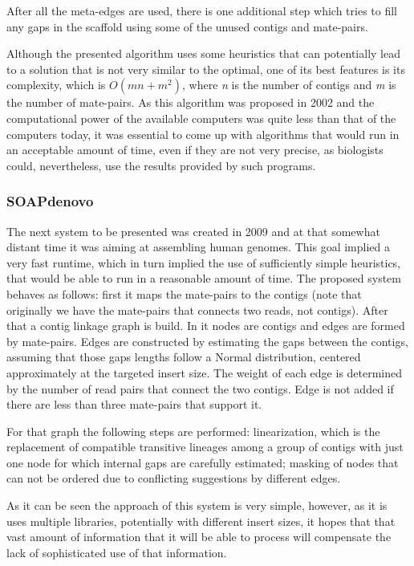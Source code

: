 \documentclass[11pt]{article}
\begin{document}
After all the meta-edges are used, there is one additional step which tries to
fill any gaps in the scaffold using some of the unused contigs and mate-pairs.

Although the presented algorithm uses some heuristics that can potentially lead
to a solution that is not very similar to the optimal, one of its best
features is its complexity, which is $O(m n + m ^ 2)$, where \emph{n} is
the number of contigs and \emph{m} is the number of mate-pairs. As this
algorithm was proposed in 2002 and the computational power of the available
computers was quite less than that of the computers today, it was essential to
come up with algorithms that would run in an acceptable amount of time, even if
they are not very precise, as biologists could, nevertheless, use the results
provided by such programs.

\subsubsection{SOAPdenovo} %
\label{ssub:SOAPdenovo}
The next system to be presented \cite{SOAPdenovo} was created in 2009 and at
that somewhat distant time it was aiming at assembling human genomes. This goal
implied a very fast runtime, which in turn implied the use of sufficiently
simple heuristics, that would be able to run in a reasonable amount of time. The
proposed system behaves as follows: first it maps the mate-pairs to the contigs
(note that originally we have the mate-pairs that connects two reads, not
contigs). After that a contig linkage graph is build. In it nodes are contigs
and edges are formed by mate-pairs. Edges are constructed by estimating the gaps
between the contigs, assuming that those gaps lengths follow a Normal
distribution, centered approximately at the targeted insert size. The weight of
each edge is determined by the number of read pairs that connect the two
contigs. Edge is not added if there are less than three mate-pairs that support
it.

For that graph the following steps are performed: linearization, which is the
replacement of compatible transitive lineages among a group of contigs with just
one node for which internal gaps are carefully estimated; masking of nodes that
can not be ordered due to conflicting suggestions by different edges.

As it can be seen the approach of this system is very simple, however, as it is
uses multiple libraries, potentially with different insert sizes, it hopes that
that vast amount of information that it will be able to process will compensate
the lack of sophisticated use of that information.
\end{document}
